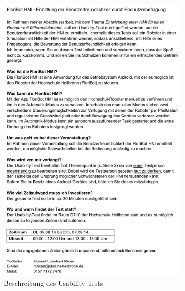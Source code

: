 \begin{figure}[H]
	\centering
		\includegraphics[width=0.85\textwidth]{03_Grafiken/Anhang/UsabilityBogen/UsabilityBeschreibung.png}
	\caption[Beschreibung des Usability-Tests]{Beschreibung des Usability-Tests}
	\label{fig:UsabilityBeschreibung}
\end{figure}
